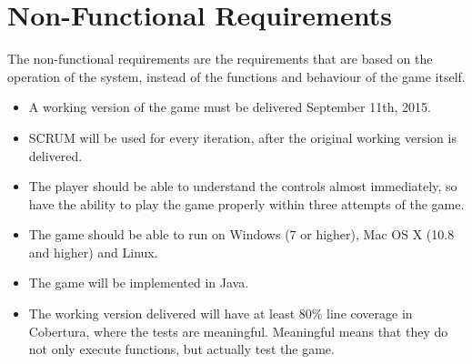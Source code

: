 \chapter{Non-Functional Requirements}

The non-functional requirements are the requirements that are based on the operation of the system, instead of the functions and behaviour of the game itself.

\begin{itemize}
\itemsep0em
	\item A working version of the game must be delivered September 11th, 2015.
	\item SCRUM will be used for every iteration, after the original working version is delivered.
	\item The player should be able to understand the controls almost immediately, so have the ability to play the game properly within three attempts of the game.
	\item The game should be able to run on Windows (7 or higher), Mac OS X (10.8 and higher) and Linux.
	\item The game will be implemented in Java. 
	\item The working version delivered will have at least 80\% line coverage in Cobertura, where the tests are meaningful. Meaningful means that they do not only execute functions, but actually test the game.
\end{itemize}
